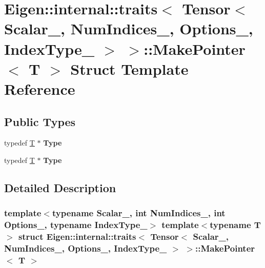 \hypertarget{struct_eigen_1_1internal_1_1traits_3_01_tensor_3_01_scalar___00_01_num_indices___00_01_options__a867f84013967cd95c2f883b666f993d}{}\section{Eigen\+:\+:internal\+:\+:traits$<$ Tensor$<$ Scalar\+\_\+, Num\+Indices\+\_\+, Options\+\_\+, Index\+Type\+\_\+ $>$ $>$\+:\+:Make\+Pointer$<$ T $>$ Struct Template Reference}
\label{struct_eigen_1_1internal_1_1traits_3_01_tensor_3_01_scalar___00_01_num_indices___00_01_options__a867f84013967cd95c2f883b666f993d}
\subsection*{Public Types}
\begin{DoxyCompactItemize}
\item 
\mbox{\label{struct_eigen_1_1internal_1_1traits_3_01_tensor_3_01_scalar___00_01_num_indices___00_01_options__a867f84013967cd95c2f883b666f993d_a9ab77299f2203cedebdfe9c5eae14294}} 
typedef \hyperlink{group___sparse_core___module}{T} $\ast$ {\bfseries Type}
\item 
\mbox{\label{struct_eigen_1_1internal_1_1traits_3_01_tensor_3_01_scalar___00_01_num_indices___00_01_options__a867f84013967cd95c2f883b666f993d_a9ab77299f2203cedebdfe9c5eae14294}} 
typedef \hyperlink{group___sparse_core___module}{T} $\ast$ {\bfseries Type}
\end{DoxyCompactItemize}


\subsection{Detailed Description}
\subsubsection*{template$<$typename Scalar\+\_\+, int Num\+Indices\+\_\+, int Options\+\_\+, typename Index\+Type\+\_\+$>$\newline
template$<$typename T$>$\newline
struct Eigen\+::internal\+::traits$<$ Tensor$<$ Scalar\+\_\+, Num\+Indices\+\_\+, Options\+\_\+, Index\+Type\+\_\+ $>$ $>$\+::\+Make\+Pointer$<$ T $>$}



